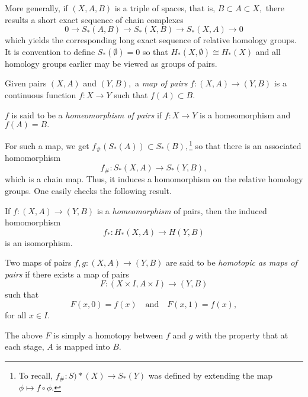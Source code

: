\documentclass[12pt]{article}
\begin{document}
More generally, if $(X, A, B)$ is a triple of spaces, that is, $B \subset A \subset X,$ there results a short exact sequence of chain complexes
\begin{equation*} 
	0 \to S_*(A, B) \to S_*(X, B) \to S_*(X, A) \to 0
\end{equation*}
which yields the corresponding long exact sequence of relative homology groups. It is convention to define $S_*(\emptyset) = 0$ so that $H_*(X, \emptyset) \cong H_*(X)$ and all homology groups earlier may be viewed as groups of pairs.

\begin{defn}
	Given pairs $(X, A)$ and $(Y, B),$ a \emph{map of pairs} $f:(X, A) \to (Y, B)$ is a continuous function $f:X \to Y$ such that $f(A) \subset B.$

	$f$ is said to be a \emph{homeomorphism of pairs} if $f:X\to Y$ is a homeomorphism and $f(A) = B.$
\end{defn}
For such a map, we get $f_\#(S_*(A))\subset S_*(B),$\footnote{To recall, $f_\#:S)*(X) \to S_*(Y)$ was defined by extending the map $\phi \mapsto f\circ\phi.$} so that there is an associated homomorphism
\begin{equation*} 
	f_\#:S_*(X, A) \to S_*(Y, B),
\end{equation*}
which is a chain map. Thus, it induces a homomorphism on the relative homology groups. One easily checks the following result.

\begin{prop}
	If $f:(X, A) \to (Y, B)$ is a \emph{homeomorphism} of pairs, then the induced homomorphism
	\begin{equation*} 
		f_*:H_*(X, A) \to H(Y, B)
	\end{equation*}
	is an isomorphism.
\end{prop}

\begin{defn}
	Two maps of pairs $f, g:(X, A) \to (Y, B)$ are said to be \emph{homotopic as maps of pairs} if there exists a map of pairs
	\begin{equation*} 
		F:(X \times I, A \times I) \to (Y, B)
	\end{equation*}
	such that
	\begin{equation*} 
		F(x, 0) = f(x) \quad\text{and}\quad F(x, 1) = f(x),
	\end{equation*}
	for all $x \in I.$
\end{defn}
The above $F$ is simply a homotopy between $f$ and $g$ with the property that at each stage, $A$ is mapped into $B.$
\end{document}

